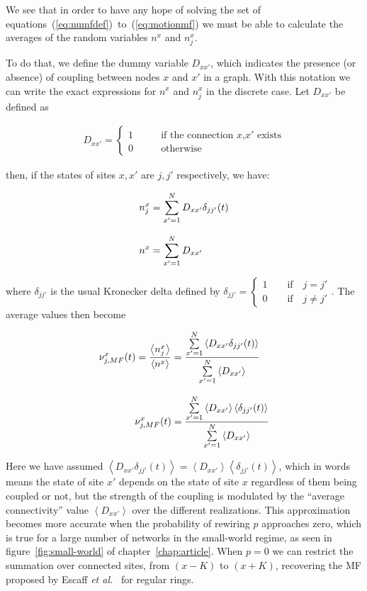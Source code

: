 We see that in order to have any hope of solving the set of equations~(\ref{eq:numfdef})~to~(\ref{eq:motionmf}) we must be able to
calculate the averages of the random variables $n^x$ and $n^x_j$.

To do that, we define the dummy variable $D_{xx'}$, which indicates the presence (or absence) of coupling between nodes $x$ and $x'$ in
a graph. With this notation we can write the exact expressions for $n^x$ and $n^x_j$ in the discrete case. Let $D_{xx'}$ be defined as

\begin{align}
    D_{xx'} = 
    \begin{cases}
        1 \qquad &\text{if the connection $x$,$x'$ exists}\\
        0 \qquad &\text{otherwise}
    \end{cases}
\end{align}

\noindent then, if the states of sites $x,x'$ are $j,j'$ respectively, we have:

\begin{align}
    n^x_j &= \sum\limits_{x'=1}^ND_{xx'}\delta_{jj'}(t) \notag\\[8pt]
    n^x &= \sum\limits_{x'=1}^ND_{xx'}
\end{align}

\noindent where $\delta_{jj'}$ is the usual Kronecker delta defined by $\delta_{jj'}=\begin{cases}1 \qquad\text{if}\quad j=j'\\0 \qquad
\text{if}\quad j\neq j'\end{cases}$. The average values then become

\begin{align}
    \nu^x_{j,MF}(t) = \frac{\left<n^x_j\right>}{\left<n^x\right>} &= \frac{\sum\limits_{x'=1}^N\left< D_{xx'}\delta_{jj'}(t)\right>}{\sum\limits_{x'=1}^N\left< D_{xx'} \right>}
    \notag \\[8pt]
    \nu^x_{j,MF}(t) &= \frac{\sum\limits_{x'=1}^N\left< D_{xx'}\right>\left<\delta_{jj'}(t)\right>}{\sum\limits_{x'=1}^N\left< D_{xx'} \right>}
    \label{eq:numf}
\end{align}

\noindent Here we have assumed $\left< D_{xx'}\delta_{jj'}(t)\right> = \left< D_{xx'}\right>\left<\delta_{jj'}(t)\right>$, which in
words means the state of site $x'$ depends on the state of site $x$ regardless of them being coupled or not, but the strength of the
coupling is modulated by the ``average connectivity'' value $\left< D_{xx'} \right>$ over the different realizations. This
approximation becomes more accurate when the probability of rewiring $p$ approaches zero, which is true for a large number of networks
in the small-world regime, as seen in figure~\ref{fig:small-world} of chapter~\ref{chap:article}. When $p=0$ we can restrict the
summation over connected sites, from $(x-K)$ to $(x+K)$, recovering the MF proposed by Escaff \textit{et al.}~\cite{escaff2014arrays}
for regular rings.

